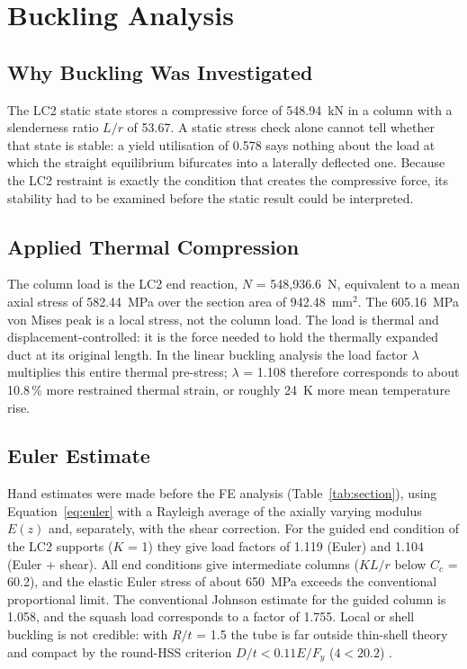 \chapter{Buckling Analysis}\label{ch:buckling}

\section{Why Buckling Was Investigated}
The LC2 static state stores a compressive force of 548.94~kN in a column with a slenderness ratio $L/r$ of 53.67. A static stress check
alone cannot tell whether that state is stable: a yield utilisation of 0.578 says nothing about the load at which the straight equilibrium
bifurcates into a laterally deflected one. Because the LC2 restraint is exactly the condition that creates the compressive force, its
stability had to be examined before the static result could be interpreted.

\section{Applied Thermal Compression}
The column load is the LC2 end reaction, $N$ = 548,936.6~N, equivalent to a mean axial stress of 582.44~MPa over the section area of
942.48~mm$^2$. The 605.16~MPa von Mises peak is a local stress, not the column load. The load is thermal and displacement-controlled: it is
the force needed to hold the thermally expanded duct at its original length. In the linear buckling analysis the load factor $\lambda$
multiplies this entire thermal pre-stress; $\lambda$ = 1.108 therefore corresponds to about 10.8\,\% more restrained thermal strain, or
roughly 24~K more mean temperature rise.

\section{Euler Estimate}
Hand estimates were made before the FE analysis (Table~\ref{tab:section}), using Equation~\eqref{eq:euler} with a Rayleigh average of the
axially varying modulus $E(z)$ and, separately, with the shear correction. For the guided end condition of the LC2 supports ($K$ = 1) they give
load factors of 1.119 (Euler) and 1.104 (Euler + shear). All end conditions give intermediate columns ($KL/r$ below $C_c$ = 60.2), and the
elastic Euler stress of about 650~MPa exceeds the conventional proportional limit. The conventional Johnson estimate for the guided column
is 1.058, and the squash load corresponds to a factor of 1.755. Local or shell buckling is not credible: with $R/t$ = 1.5 the tube is far
outside thin-shell theory and compact by the round-HSS criterion $D/t < 0.11E/F_y$ ($4 < 20.2$) \cite{aisc360}.

